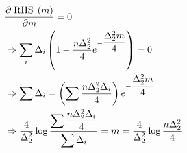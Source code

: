 \documentclass{article}
\begin{document}
\begin{align*}
&  \dfrac{\partial \text{\;RHS\;}\left(m \right)}{\partial m} = 0
\\ &\Rightarrow  \displaystyle\sum_{i} \Delta_{i} \left(1 - \dfrac{n \Delta_{2}^{2}}{4} e^{- \dfrac{\Delta_{2}^{2} m}{4}}\right) = 0
\\ &\Rightarrow  \displaystyle\sum \Delta_{i} = \left(\displaystyle\sum \dfrac{n \Delta_{2}^{2} \Delta_{i}}{4}\right) e^{- \dfrac{\Delta_{2}^{2} m}{4}}
\\ &\Rightarrow  \dfrac{4}{\Delta_{2}^{2}} \log \dfrac{\displaystyle\sum \dfrac{n \Delta_{2}^{2} \Delta_{i}}{4}}{\displaystyle\sum \Delta_{i}} = m = \dfrac{4}{\Delta_{2}^{2}} \log \dfrac{n \Delta_{2}^{2}}{4}
\end{align*}
\end{document}
